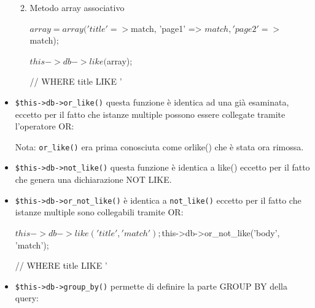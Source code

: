 \begin{itemize}
\begin{enumerate}

\item Metodo array associativo

\begin{code}
$array = array('title' => $match, 'page1' => $match, 'page2' => $match);

$this->db->like($array); 

// WHERE title LIKE '%
\end{code}
\end{enumerate}

\item \verb|$this->db->or_like()| questa funzione è identica ad una già esaminata, eccetto per il fatto che istanze multiple possono essere collegate tramite l'operatore OR:


Nota: \verb|or_like()| era prima conosciuta come orlike() che è stata ora rimossa.

\item \verb|$this->db->not_like()| questa funzione è identica a like() eccetto per il fatto che genera una dichiarazione NOT LIKE.


\item \verb|$this->db->or_not_like()| è identica a \verb|not_like()| eccetto per il fatto che istanze multiple sono collegabili tramite OR:

\begin{code}
$this->db->like('title', 'match');
$this->db->or_not_like('body', 'match'); 

// WHERE title LIKE '%
\end{code}

\item \verb|$this->db->group_by()| permette di definire la parte GROUP BY della query:


\end{itemize}
